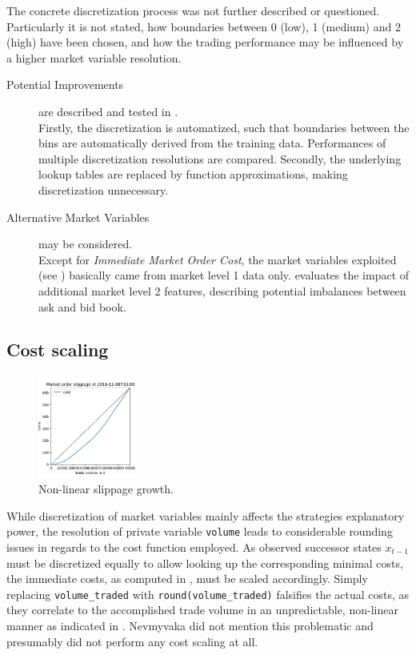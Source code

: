 The concrete discretization process was not further described or questioned. Particularly it is not stated, how boundaries between 0 (low), 1 (medium) and 2 (high) have been chosen, and how the trading performance may be influenced by a higher market variable resolution.

\begin{description}
\item[Potential Improvements] are described and tested in .\\
Firstly, the discretization is automatized, such that boundaries between the bins are automatically derived from the training data. Performances of multiple discretization resolutions are compared. Secondly, the underlying lookup tables are replaced by function approximations, making discretization unnecessary.
\item[Alternative Market Variables] may be considered.\\
Except for \emph{Immediate Market Order Cost}, the market variables exploited (see ) basically came from market level 1 data only.  evaluates the impact of additional market level 2 features, describing potential imbalances between ask and bid book.
\end{description}



\subsection{Cost scaling}
\label{chap:backwardalgorithm:discussion:costscaling}
\begin{figure}
	\centering
	\includegraphics[width=0.3\textwidth]{content/drawings/nonlinearcosts}
	\caption{Non-linear slippage growth.}
	\label{fig:nonlinearcosts}
\end{figure}
While discretization of market variables mainly affects the strategies explanatory power, the resolution of private variable \lstinline!volume! leads to considerable rounding issues in regards to the cost function employed. As observed successor states $x_{t-1}$ must be discretized equally to allow looking up the corresponding minimal costs, the immediate costs, as computed in , must be scaled accordingly. Simply replacing \lstinline!volume_traded! with \lstinline!round(volume_traded)! falsifies the actual costs, as they correlate to the accomplished trade volume in an  unpredictable, non-linear manner as indicated in . Nevmyvaka \etal \Cite{Nevmyvaka:2006} did not mention this problematic and presumably did not perform any cost scaling at all.

